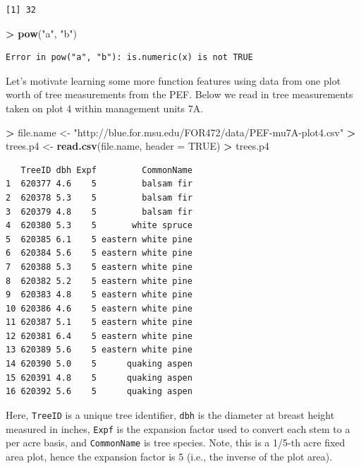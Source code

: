 \documentclass[]{krantz}
\makeatletter
\newenvironment{Shaded}{\begin{snugshade}}{\end{snugshade}}
\newcommand{\KeywordTok}[1]{\textcolor[rgb]{0.27,0.27,0.27}{\textbf{#1}}}
\newcommand{\DataTypeTok}[1]{\textcolor[rgb]{0.27,0.27,0.27}{#1}}
\newcommand{\StringTok}[1]{\textcolor[rgb]{0.5,0.5,0.5}{#1}}
\newcommand{\OtherTok}[1]{\textcolor[rgb]{0.37,0.37,0.37}{#1}}
\newcommand{\OperatorTok}[1]{\textcolor[rgb]{0.43,0.43,0.43}{\textbf{#1}}}
\newcommand{\NormalTok}[1]{#1}
\newenvironment{kframe}{%
\medskip{}
\setlength{\fboxsep}{.8em}
 \def\at@end@of@kframe{}%
 \ifinner\ifhmode%
  \def\at@end@of@kframe{\end{minipage}}%
  \begin{minipage}{\columnwidth}%
 \fi\fi%
 \def\FrameCommand##1{\hskip\@totalleftmargin \hskip-\fboxsep
 \colorbox{shadecolor}{##1}\hskip-\fboxsep
     \hskip-\linewidth \hskip-\@totalleftmargin \hskip\columnwidth}%
 \MakeFramed {\advance\hsize-\width
   \@totalleftmargin\z@ \linewidth\hsize
   \@setminipage}}%
 {\par\unskip\endMakeFramed%
 \at@end@of@kframe}
\renewenvironment{Shaded}{\begin{kframe}}{\end{kframe}}
\theoremstyle{definition}
\theoremstyle{definition}
\theoremstyle{definition}
\theoremstyle{remark}
\makeatother
\begin{document}
\begin{verbatim}
[1] 32
\end{verbatim}

\begin{Shaded}
\begin{Highlighting}[]
\OperatorTok{>}\StringTok{ }\KeywordTok{pow}\NormalTok{(}\StringTok{"a"}\NormalTok{, }\StringTok{"b"}\NormalTok{)}
\end{Highlighting}
\end{Shaded}

\begin{verbatim}
Error in pow("a", "b"): is.numeric(x) is not TRUE
\end{verbatim}

Let's motivate learning some more function features using data from one
plot worth of tree measurements from the PEF. Below we read in tree
measurements taken on plot 4 within management units 7A.

\begin{Shaded}
\begin{Highlighting}[]
\OperatorTok{>}\StringTok{ }\NormalTok{file.name <-}\StringTok{ "http://blue.for.msu.edu/FOR472/data/PEF-mu7A-plot4.csv"}
\OperatorTok{>}\StringTok{ }\NormalTok{trees.p4 <-}\StringTok{ }\KeywordTok{read.csv}\NormalTok{(file.name, }\DataTypeTok{header =} \OtherTok{TRUE}\NormalTok{)}
\OperatorTok{>}\StringTok{ }\NormalTok{trees.p4}
\end{Highlighting}
\end{Shaded}

\begin{verbatim}
   TreeID dbh Expf         CommonName
1  620377 4.6    5         balsam fir
2  620378 5.3    5         balsam fir
3  620379 4.8    5         balsam fir
4  620380 5.3    5       white spruce
5  620385 6.1    5 eastern white pine
6  620384 5.6    5 eastern white pine
7  620388 5.3    5 eastern white pine
8  620382 5.2    5 eastern white pine
9  620383 4.8    5 eastern white pine
10 620386 4.6    5 eastern white pine
11 620387 5.1    5 eastern white pine
12 620381 6.4    5 eastern white pine
13 620389 5.6    5 eastern white pine
14 620390 5.0    5      quaking aspen
15 620391 4.8    5      quaking aspen
16 620392 5.6    5      quaking aspen
\end{verbatim}

Here, \texttt{TreeID} is a unique tree identifier, \texttt{dbh} is the
diameter at breast height measured in inches, \texttt{Expf} is the
expansion factor used to convert each stem to a per acre basis, and
\texttt{CommonName} is tree species. Note, this is a 1/5-th acre fixed
area plot, hence the expansion factor is 5 (i.e., the inverse of the
plot area).
\end{document}
